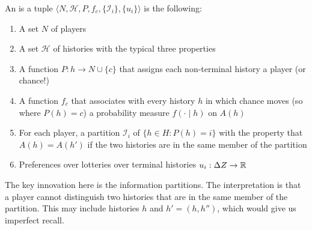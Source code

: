 \documentclass[10pt]{article}
\begin{document}
\begin{definition}
	An  is a tuple $\langle N, \mathcal{H}, P, f_c, \{\mathscr{I}_i\}, \{u_i\}\rangle$ is the following:
	\begin{enumerate}
		\item A set $N$ of players
		\item A set $\mathcal{H}$ of histories with the typical three properties
		\item A function $P : h \to N \cup \{c\}$ that assigns each non-terminal history a player (or chance!)
		\item A function $f_c$ that associates with every history $h$ in which chance moves (so where $P(h) = c$) a probability measure $f(\cdot\mid h)$ on $A(h)$
		\item For each player, a partition $\mathscr{I}_i$ of $\{h \in H : P(h) = i\}$ with the property that $A(h) = A(h')$ if the two histories are in the same member of the partition
		\item Preferences over lotteries over terminal histories $u_i: \Delta Z \to \mathbb{R}$
	\end{enumerate}
\end{definition}

\begin{remark}
The key innovation here is the information partitions. The interpretation is that a player cannot distinguish two histories that are in the same member of the partition. This may include histories $h$ and $h' = (h,h'')$, which would give us imperfect recall.
\end{remark}
\end{document}
